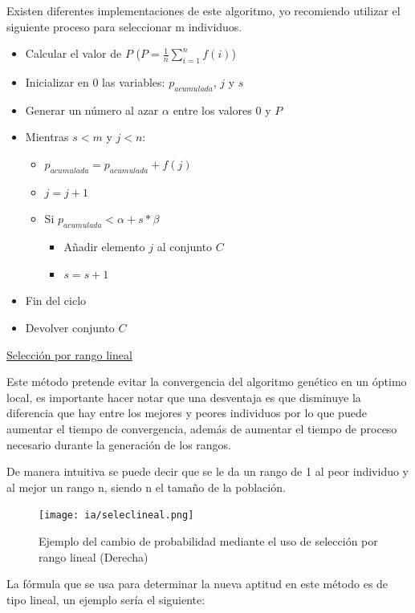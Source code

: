 \documentclass[11pt,fleqn]{book} %
\begin{document}
Existen diferentes implementaciones de este algoritmo, yo recomiendo utilizar el siguiente proceso para seleccionar m individuos.
\begin{itemize}
\item Calcular el valor de $P$ ($P = \frac{1}{n} \sum_{i=1}^{n} f(i)$)
\item Inicializar en 0 las variables: $p_{acumulada}$, $j$ y $s$
\item Generar un número al azar $\alpha$ entre los valores 0 y $P$
\item Mientras $s<m$  y   $j<n$:

\begin{itemize}
\item $p_{acumulada} = p_{acumulada} + f(j)$
\item $j = j+1$
\item Si $p_{acumulada} < \alpha+s*\beta$

\begin{itemize}
\item Añadir elemento $j$ al conjunto $C$
\item $s = s+1$
\end{itemize}

\end{itemize}

\item Fin del ciclo
\item Devolver conjunto $C$
\end{itemize}

\underline{Selección por rango lineal}

Este método pretende evitar la convergencia del algoritmo genético en un óptimo local, es importante hacer notar que una desventaja es que disminuye la diferencia que hay entre los mejores y peores individuos por lo que puede aumentar el tiempo de convergencia, además de aumentar el tiempo de proceso necesario durante la generación de los rangos.

De manera intuitiva se puede decir que se le da un rango de 1 al peor individuo y al mejor un rango n, siendo n el tamaño de la población.

\begin{figure}[ht]
\centering\texttt{[image: ia/seleclineal.png]}
\caption{Ejemplo del cambio de probabilidad mediante el uso de selección por rango lineal (Derecha)}
\label{fig:ga-sel-lineal} 
\end{figure}

La fórmula que se usa para determinar la nueva aptitud en este método es de tipo lineal, un ejemplo sería el siguiente:
\end{document}
